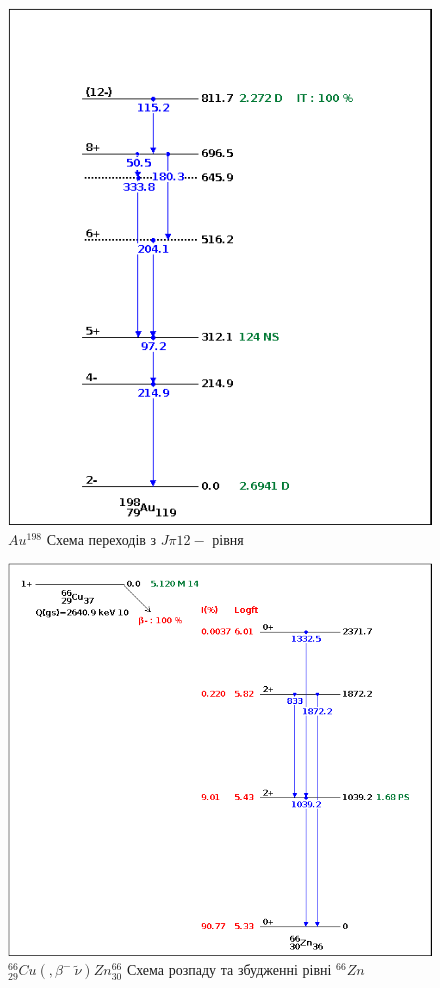 \documentclass[a4paper, 14pt]{article}
\numberwithin{equation}{section}
\numberwithin{table}{section}
\begin{document}
\begin{figure}[!]
	\centering \includegraphics[width=1\textwidth]{images/au198levels.png}
	\caption{$Au^{198}$ Схема переходів з $J\pi 12-$ рівня} 
	\label{ris:Au198Level12-}	
\end{figure} 
\begin{figure}[!]
	\centering \includegraphics[width=1\textwidth]{images/cu66lbetadecay.png}
	\caption{$^{66}_{29}Cu(,\beta^-\  \tilde{\nu})Zn^{66}_{30}$ Схема розпаду та збудженні рівні $^{66}Zn$} 
	\label{ris:ZnLevels-}	
\end{figure} 
\end{document}
